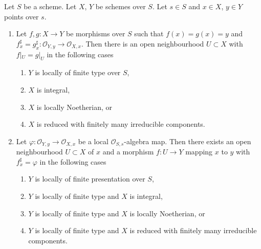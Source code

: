 \begin{lemma}
\label{lemma-morphism-defined-local-ring}
Let $S$ be a scheme. Let $X$, $Y$ be schemes over $S$.
Let $s \in S$ and $x \in X$, $y \in Y$ points over $s$.
\begin{enumerate}
\item Let $f, g : X \to Y$ be morphisms over $S$ such that
$f(x) = g(x) = y$ and
$f^\sharp_x = g^\sharp_x : \mathcal{O}_{Y, y} \to \mathcal{O}_{X, x}$.
Then there is an open neighbourhood $U \subset X$ with
$f|_U = g|_U$ in the following cases
\begin{enumerate}
\item $Y$ is locally of finite type over $S$,
\item $X$ is integral,
\item $X$ is locally Noetherian, or
\item $X$ is reduced with finitely many irreducible components.
\end{enumerate}
\item Let $\varphi : \mathcal{O}_{Y, y} \to \mathcal{O}_{X, x}$
be a local $\mathcal{O}_{S, s}$-algebra map. Then there exists
an open neighbourhood $U \subset X$ of $x$ and a morphism $f : U \to Y$
mapping $x$ to $y$ with $f^\sharp_x = \varphi$ in the following cases
\begin{enumerate}
\item $Y$ is locally of finite presentation over $S$,
\item $Y$ is locally of finite type and $X$ is integral,
\item $Y$ is locally of finite type and $X$ is locally Noetherian, or
\item $Y$ is locally of finite type and $X$ is reduced with finitely
many irreducible components.
\end{enumerate}
\end{enumerate}
\end{lemma}

